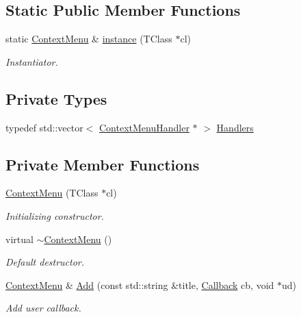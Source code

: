 \subsection*{Static Public Member Functions}
\begin{DoxyCompactItemize}
\item 
static \hyperlink{class_d_d4hep_1_1_context_menu}{Context\+Menu} \& \hyperlink{class_d_d4hep_1_1_context_menu_a2078c5a59a73ba9d83e6d22f1fa52e6a}{instance} (T\+Class $\ast$cl)
\begin{DoxyCompactList}\small\item\em Instantiator. \end{DoxyCompactList}\end{DoxyCompactItemize}
\subsection*{Private Types}
\begin{DoxyCompactItemize}
\item 
typedef std\+::vector$<$ \hyperlink{class_d_d4hep_1_1_context_menu_handler}{Context\+Menu\+Handler} $\ast$ $>$ \hyperlink{class_d_d4hep_1_1_context_menu_adafcfb2730659701df2a5364333ed386}{Handlers}
\end{DoxyCompactItemize}
\subsection*{Private Member Functions}
\begin{DoxyCompactItemize}
\item 
\hyperlink{class_d_d4hep_1_1_context_menu_aef60e3701d390f8a172be3de9c5a59ba}{Context\+Menu} (T\+Class $\ast$cl)
\begin{DoxyCompactList}\small\item\em Initializing constructor. \end{DoxyCompactList}\item 
virtual \hyperlink{class_d_d4hep_1_1_context_menu_a0ddd00b5e23fb9d89ad3cabae38aecf9}{$\sim$\+Context\+Menu} ()
\begin{DoxyCompactList}\small\item\em Default destructor. \end{DoxyCompactList}\item 
\hyperlink{class_d_d4hep_1_1_context_menu}{Context\+Menu} \& \hyperlink{class_d_d4hep_1_1_context_menu_a3345427ddd214ddcd9cf382ac89295ca}{Add} (const std\+::string \&title, \hyperlink{class_d_d4hep_1_1_callback}{Callback} cb, void $\ast$ud)
\begin{DoxyCompactList}\small\item\em Add user callback. \end{DoxyCompactList}\end{DoxyCompactItemize}
